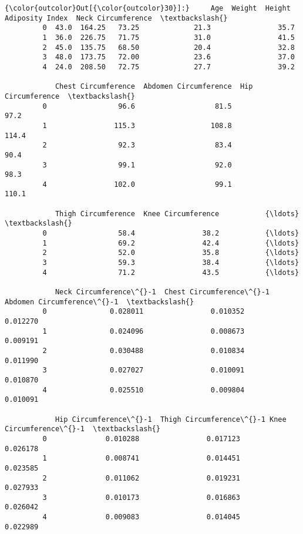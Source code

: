 \documentclass[11pt]{article}
\begin{document}
\begin{Verbatim}[commandchars=\\\{\}]
{\color{outcolor}Out[{\color{outcolor}30}]:}     Age  Weight  Height  Adiposity Index  Neck Circumference  \textbackslash{}
         0  43.0  164.25   73.25             21.3                35.7   
         1  36.0  226.75   71.75             31.0                41.5   
         2  45.0  135.75   68.50             20.4                32.8   
         3  48.0  173.75   72.00             23.6                37.0   
         4  24.0  208.50   72.75             27.7                39.2   
         
            Chest Circumference  Abdomen Circumference  Hip Circumference  \textbackslash{}
         0                 96.6                   81.5               97.2   
         1                115.3                  108.8              114.4   
         2                 92.3                   83.4               90.4   
         3                 99.1                   92.0               98.3   
         4                102.0                   99.1              110.1   
         
            Thigh Circumference  Knee Circumference           {\ldots}            \textbackslash{}
         0                 58.4                38.2           {\ldots}             
         1                 69.2                42.4           {\ldots}             
         2                 52.0                35.8           {\ldots}             
         3                 59.3                38.4           {\ldots}             
         4                 71.2                43.5           {\ldots}             
         
            Neck Circumference\^{}-1  Chest Circumference\^{}-1  Abdomen Circumference\^{}-1  \textbackslash{}
         0               0.028011                0.010352                  0.012270   
         1               0.024096                0.008673                  0.009191   
         2               0.030488                0.010834                  0.011990   
         3               0.027027                0.010091                  0.010870   
         4               0.025510                0.009804                  0.010091   
         
            Hip Circumference\^{}-1  Thigh Circumference\^{}-1 Knee Circumference\^{}-1  \textbackslash{}
         0              0.010288                0.017123              0.026178   
         1              0.008741                0.014451              0.023585   
         2              0.011062                0.019231              0.027933   
         3              0.010173                0.016863              0.026042   
         4              0.009083                0.014045              0.022989   
         

\end{Verbatim}
\end{document}
